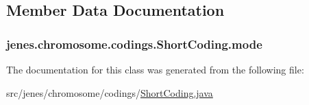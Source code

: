 \subsection{Member Data Documentation}
\hypertarget{classjenes_1_1chromosome_1_1codings_1_1_short_coding_a39b438917e13117e9f68757a40f907c2}{
\subsubsection[{mode}]{ jenes.\-chromosome.\-codings.\-Short\-Coding.\-mode\hspace{0.3cm}{\ttfamily [private]}}}\label{classjenes_1_1chromosome_1_1codings_1_1_short_coding_a39b438917e13117e9f68757a40f907c2}


The documentation for this class was generated from the following file\-:\begin{DoxyCompactItemize}
\item 
src/jenes/chromosome/codings/\hyperlink{_short_coding_8java}{Short\-Coding.\-java}\end{DoxyCompactItemize}

